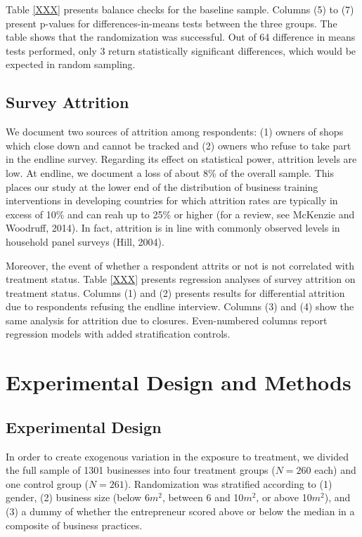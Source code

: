 \documentclass[11.5pt]{article}
\begin{document}
Table \ref{XXX} presents balance checks for the baseline sample. Columns (5) to (7) present p-values for differences-in-means tests between the three groups. The table shows that the randomization was successful. Out of 64 difference in means tests performed, only 3 return statistically significant differences, which would be expected in random sampling.

\subsection{Survey Attrition}

We document two sources of attrition among respondents: (1) owners of shops which close down and cannot be tracked and (2) owners who refuse to take part in the endline survey. Regarding its effect on statistical power, attrition levels are low. At endline, we document a loss of about 8\% of the overall sample. This places our study at the lower end of the distribution of business training interventions in developing countries for which attrition rates are typically in excess of 10\% and can reah up to 25\% or higher (for a review, see McKenzie and Woodruff, 2014). In fact, attrition is in line with commonly observed levels in household panel surveys (Hill, 2004).

Moreover, the event of whether a respondent attrits or not is not correlated with treatment status. Table \ref{XXX} presents regression analyses of survey attrition on treatment status. Columns (1) and (2) presents results for differential attrition due to respondents refusing the endline interview. Columns (3) and (4) show the same analysis for attrition due to closures. Even-numbered columns report regression models with added stratification controls.


\section{\textbf{Experimental Design and Methods}}

\subsection{Experimental Design}

In order to create exogenous variation in the exposure to treatment, we divided the full sample of 1301 businesses into four treatment groups ($N = 260$ each) and one control group ($N = 261$). Randomization was stratified according to (1) gender, (2) business size (below 6$m^2$, between 6 and 10$m^2$, or above 10$m^2$), and (3) a dummy of whether the entrepreneur scored above or below the median in a composite of business practices.
\end{document}
